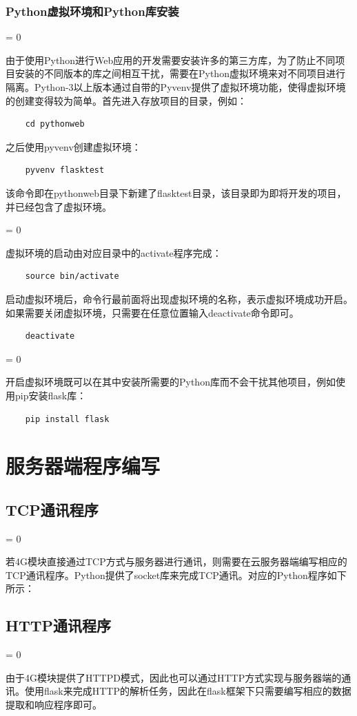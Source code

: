 \documentclass[a4paper,11pt]{ctexart}
\newcommand{\subpar}
{
	\par
	\hangafter = 0
	\setlength{\hangindent}{1em}
}
\newcommand{\subsubpar}
{
	\par
	\hangafter = 0
	\setlength{\hangindent}{2em}
}
\begin{document}
\begin{spacing}{1.5}
\subsubsection{Python虚拟环境和Python库安装}
\subsubpar
由于使用Python进行Web应用的开发需要安装许多的第三方库，为了防止不同项目安装的不同版本的库之间相互干扰，需要在Python虚拟环境来对不同项目进行隔离。Python-3以上版本通过自带的Pyvenv提供了虚拟环境功能，使得虚拟环境的创建变得较为简单。首先进入存放项目的目录，例如：
\begin{verbatim}
    cd pythonweb
\end{verbatim}
之后使用pyvenv创建虚拟环境：
\begin{verbatim}
    pyvenv flasktest
\end{verbatim}
该命令即在pythonweb目录下新建了flasktest目录，该目录即为即将开发的项目，并已经包含了虚拟环境。
\subsubpar
虚拟环境的启动由对应目录中的activate程序完成：
\begin{verbatim}
    source bin/activate
\end{verbatim}
启动虚拟环境后，命令行最前面将出现虚拟环境的名称，表示虚拟环境成功开启。如果需要关闭虚拟环境，只需要在任意位置输入deactivate命令即可。
\begin{verbatim}
    deactivate
\end{verbatim}
\subsubpar
开启虚拟环境既可以在其中安装所需要的Python库而不会干扰其他项目，例如使用pip安装flask库：
\begin{verbatim}
    pip install flask
\end{verbatim}




\section{服务器端程序编写}
\subsection{TCP通讯程序}
\subpar
若4G模块直接通过TCP方式与服务器进行通讯，则需要在云服务器端编写相应的TCP通讯程序。Python提供了socket库来完成TCP通讯。对应的Python程序如下所示：
\subsection{HTTP通讯程序}
\subpar
由于4G模块提供了HTTPD模式，因此也可以通过HTTP方式实现与服务器端的通讯。使用flask来完成HTTP的解析任务，因此在flask框架下只需要编写相应的数据提取和响应程序即可。




\end{spacing}
\end{document}
